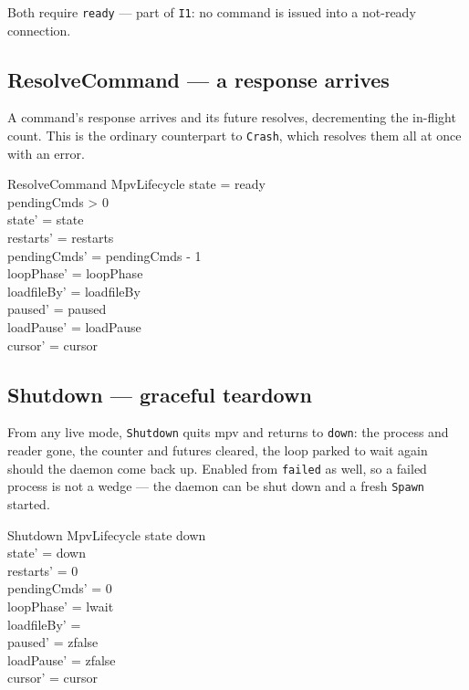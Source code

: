 \documentclass[a4paper,10pt,fleqn]{article}
\begin{document}
Both require \texttt{ready} --- part of \texttt{I1}: no command is issued into
a not-ready connection.

\subsection{ResolveCommand --- a response arrives}
\label{sec:resolve}

A command's response arrives and its future resolves, decrementing the
in-flight count. This is the ordinary counterpart to \texttt{Crash}, which
resolves them all at once with an error.

\begin{schema}{ResolveCommand}
  \Delta MpvLifecycle
  \where
  state = ready \\
  pendingCmds > 0 \\
  state' = state \\
  restarts' = restarts \\
  pendingCmds' = pendingCmds - 1 \\
  loopPhase' = loopPhase \\
  loadfileBy' = loadfileBy \\
  paused' = paused \\
  loadPause' = loadPause \\
  cursor' = cursor
\end{schema}

\subsection{Shutdown --- graceful teardown}
\label{sec:shutdown}

From any live mode, \texttt{Shutdown} quits mpv and returns to \texttt{down}:
the process and reader gone, the counter and futures cleared, the loop parked
to wait again should the daemon come back up. Enabled from \texttt{failed} as
well, so a failed process is not a wedge --- the daemon can be shut down and a
fresh \texttt{Spawn} started.

\begin{schema}{Shutdown}
  \Delta MpvLifecycle
  \where
  state \neq down \\
  state' = down \\
  restarts' = 0 \\
  pendingCmds' = 0 \\
  loopPhase' = lwait \\
  loadfileBy' = \emptyset \\
  paused' = zfalse \\
  loadPause' = zfalse \\
  cursor' = cursor
\end{schema}
\end{document}

